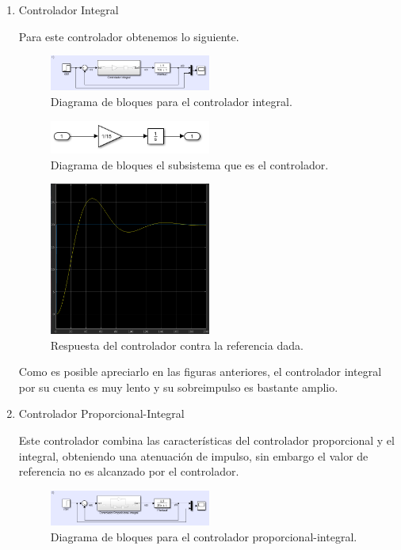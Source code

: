 \documentclass[12pt, letterpaper]{article}
\begin{document}
\begin{enumerate}
\begin{enumerate}
					\item Controlador Integral

						Para este controlador obtenemos lo siguiente.

				\begin{figure}[H]
					\centering
					\includegraphics[width=0.5\textwidth]{2c.png}
					\caption{Diagrama de bloques para el controlador integral.}
				\end{figure}

				\begin{figure}[H]
					\centering
					\includegraphics[width=0.5\textwidth]{2cc.png}
					\caption{Diagrama de bloques el subsistema que es el controlador.}
				\end{figure}

				\begin{figure}[H]
					\centering
					\includegraphics[width=0.5\textwidth]{2ccc.png}
					\caption{Respuesta del controlador contra la referencia dada.}
				\end{figure}
						Como es posible apreciarlo en las figuras anteriores, el controlador integral por su cuenta es muy lento y su sobreimpulso es bastante amplio.
					\item Controlador Proporcional-Integral

						Este controlador combina las características del controlador proporcional y el integral, obteniendo una atenuación de impulso, sin embargo el valor de referencia no es alcanzado por el controlador.

				\begin{figure}[H]
					\centering
					\includegraphics[width=0.5\textwidth]{2d.png}
					\caption{Diagrama de bloques para el controlador proporcional-integral.}
				\end{figure}


\end{enumerate}
\end{enumerate}
\end{document}
